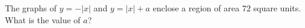 The graphs of $y=-|x|$ and $y=|x|+a$ enclose a region of area $72$ square units. What is the value of $a$?
